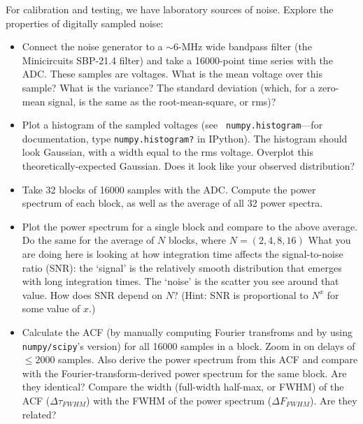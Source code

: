 \documentclass[12pt,preprint]{aastex}
\begin{document}
For calibration and testing, we have laboratory sources of noise. Explore
the properties of digitally sampled noise:

\begin{itemize}

\item Connect the noise generator to a $\sim 6$-MHz wide bandpass
  filter (the Minicircuits SBP-21.4 filter) and take a 16000-point time
  series with the ADC. These samples are voltages. What is the
  mean voltage over this sample?
  What is the variance? The standard deviation (which, for a zero-mean signal,
  is the same as the root-mean-square, or rms)?

\item Plot a histogram of the sampled voltages (see {\tt
  numpy.histogram}---for documentation, type {\tt numpy.histogram?} in IPython).
  The histogram
  should look Gaussian, with a width equal to the rms
  voltage. Overplot this theoretically-expected Gaussian. Does it look
  like your observed distribution?

\item Take 32 blocks of 16000 samples with the ADC. Compute the power spectrum
  of each block, as well as the average of all 32 power
  spectra.

\item Plot the power spectrum for a single block and compare to the
  above average. Do the same for the average of $N$ blocks, where $N=(2,
  4, 8, 16)$ What you are doing here is looking at how integration time
  affects the signal-to-noise ratio (SNR): the `signal' is the relatively
  smooth distribution that emerges with long integration times.
  The `noise' is the scatter you see around that value. How does
  SNR depend on $N$? (Hint: SNR is proportional to $N^x$ for some value of $x$.)

\item Calculate the ACF (by manually computing Fourier transfroms and by using \verb$numpy/scipy$'s version)
  for all
  16000 samples in a block. Zoom in on delays of $\le 2000$ samples. Also derive the power
  spectrum from this ACF and compare with the Fourier-transform-derived power
  spectrum for the same block.  Are they identical?
  Compare the width (full-width half-max, or FWHM) of the ACF ($\Delta
  \tau_{FWHM}$) with the FWHM of the power spectrum ($\Delta
  F_{FWHM}$). Are they related?

\end{itemize}

\end{document}
